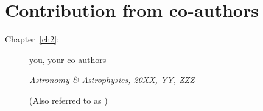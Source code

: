
\newcommand{\coitem}[1]{\item[Chapter~\ref{#1}:] \nameref{#1}}
\newcommand{\coauthors}[1]{\begin{flushleft} {\rm\normalsize #1} \\ \end{flushleft}}
\newcommand{\cojournal}[1]{\begin{flushleft} {\it\normalsize #1} \\ \medskip \end{flushleft}}
\newcommand{\note}[1]{\begin{flushleft} {\footnotesize \normalsize #1} \\ \medskip \end{flushleft}}

\chapter{Contribution from co-authors}

 \bigskip

\begin{description} 

  \coitem{ch2} %
  \coauthors{you, your co-authors}
  \cojournal{Astronomy \& Astrophysics, 20XX, YY, ZZZ}
  \note{(Also referred to as \citealt{})}
    
\end{description}

  



\renewcommand\chapterautorefname{chapter}


